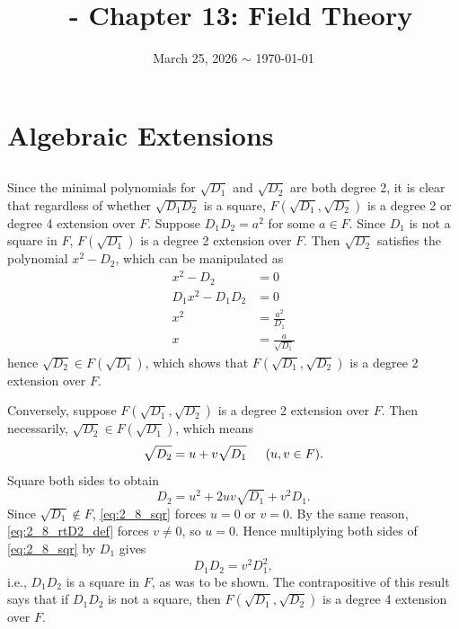 \documentclass[12pt]{article}
\title{\course\ - Chapter 13: Field Theory}
\author{\myname}
\date{March 25, 2026 $\sim$ \today}
\begin{document}
\maketitle
\thispagestyle{fancy}

\setcounter{section}{1}
\section{Algebraic Extensions}
\setcounter{subsection}{7} 
\subsection{}
Since the minimal polynomials for $\sqrt{D_1}$ and $\sqrt{D_2}$ are both degree 2, it is clear that regardless of whether $\sqrt{D_1 D_2}$ is a square, $F(\sqrt{D_1}, \sqrt{D_2})$ is a degree 2 or degree 4 extension over $F$. 
Suppose $D_{1} D_{2} = a^2$ for some $a \in F$. 
Since $D_1$ is not a square in $F$, $F(\sqrt{D_{1}})$ is a degree 2 extension over $F$. 
Then $\sqrt{D_{2}}$ satisfies the polynomial $x^2 - D_2$, which can be manipulated as 
\begin{align*}
  x^2 - D_2 & = 0 \\ 
  D_{1} x^2 - D_{1} D_{2} & = 0 \\ 
  x^2 & = \frac{a^2}{D_{1}} \\ 
  x & = \frac{a}{\sqrt{D_1}}
\end{align*}
hence $\sqrt{D_2} \in F(\sqrt{D_1})$, which shows that $F(\sqrt{D_1}, \sqrt{D_2})$ is a degree 2 extension over $F$.  

Conversely, suppose $F(\sqrt{D_1}, \sqrt{D_2})$ is a degree 2 extension over $F$. 
Then necessarily, $\sqrt{D_2} \in F(\sqrt{D_1})$, which means 
\begin{equation} \label{eq:2_8_rtD2_def}
  \sqrt{D_2} = u + v\sqrt{D_1} \hspace{1.5em} (u, v \in F).
\end{equation} 
Square both sides to obtain 
\begin{equation} \label{eq:2_8_sqr} 
  D_2 = u^2 + 2uv\sqrt{D_1} + v^2 D_1.
\end{equation}
Since $\sqrt{D_1} \notin F$, \eqref{eq:2_8_sqr} forces $u = 0$ or $v = 0$. 
By the same reason, \eqref{eq:2_8_rtD2_def} forces $v \neq 0$, so $u = 0$. 
Hence multiplying both sides of \eqref{eq:2_8_sqr} by $D_1$ gives 
$$D_1 D_2 = v^2 D_{1}^{2},$$
i.e., $D_1 D_2$ is a square in $F$, as was to be shown. 
The contrapositive of this result says that if $D_1 D_2$ is not a square, then $F(\sqrt{D_1}, \sqrt{D_2})$ is a degree 4 extension over $F$. 
\end{document}
